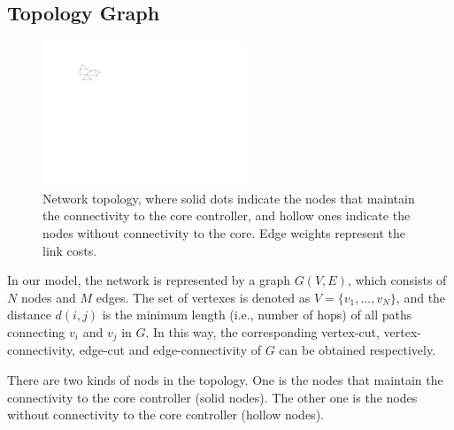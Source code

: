 \documentclass[conference]{IEEEtran}
\begin{document}
\subsection{Topology Graph}
\begin{figure}
\centering
\includegraphics[width=2.4in]{model_v.pdf}
\caption{Network topology, where solid dots indicate the nodes that maintain the connectivity to the core controller, and hollow ones indicate the nodes without connectivity to the core. Edge weights represent the link costs.}
\label{model}
\end{figure}
In our model, the network is represented by a graph $G(V,E)$, which consists of $N$ nodes and $M$ edges. The set of vertexes is denoted as $V = \{v_1,...,v_N\}$, and the distance $d(i,j)$ is the minimum length (i.e., number of hops) of all paths connecting $v_i$ and $v_j$ in $G$. In this way, the corresponding vertex-cut, vertex-connectivity, edge-cut and edge-connectivity of $G$ can be obtained respectively.

There are two kinds of nods in the topology. One is the nodes that maintain the connectivity to the core controller (solid nodes). The other one is the nodes without connectivity to the core controller (hollow nodes).
\end{document}

